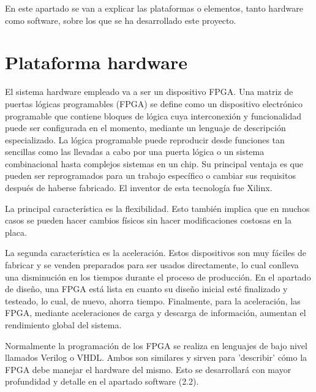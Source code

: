 
\label{chp:ManLaTeX}
\minitoc
\vspace{1cm}
En este apartado se van a explicar las plataformas o elementos, tanto hardware como 
software, sobre los que se ha desarrollado este proyecto. 

\section{Plataforma hardware}
El sistema hardware empleado va a ser un dispositivo FPGA. Una matriz de puertas lógicas 
programables (FPGA) se define como un dispositivo electrónico programable que contiene 
bloques de lógica cuya interconexión y funcionalidad puede ser configurada en el momento, 
mediante un lenguaje de descripción especializado. La lógica programable puede reproducir 
desde funciones tan sencillas como las llevadas a cabo por una puerta lógica o un sistema 
combinacional hasta complejos sistemas en un chip. Su principal 
ventaja es que pueden ser reprogramados para un trabajo específico o cambiar sus 
requisitos después de haberse fabricado. El inventor de esta tecnología fue 
Xilinx. \cite{fpga}

La principal característica es la flexibilidad. Esto también implica que en muchos
casos se pueden hacer cambios físicos sin hacer modificaciones costosas en la placa.

La segunda característica es la aceleración. 
Estos dispositivos son muy fáciles de fabricar y se venden preparados para ser usados 
directamente, lo cual conlleva una disminución en los tiempos durante el 
proceso de producción. 
En el apartado de diseño, una FPGA está lista en cuanto su diseño inicial esté finalizado
y testeado, lo cual, de nuevo, ahorra tiempo. Finalmente, para la aceleración, las FPGA, 
mediante aceleraciones de carga y descarga de información, aumentan el 
rendimiento global del sistema. \cite{fpga}

Normalmente la programación de los FPGA se realiza en lenguajes de 
bajo nivel llamados Verilog o VHDL. Ambos son similares y sirven para 'describir' cómo
la FPGA debe manejar el hardware del mismo. Esto se desarrollará con mayor profundidad
y detalle en el apartado software (2.2).


